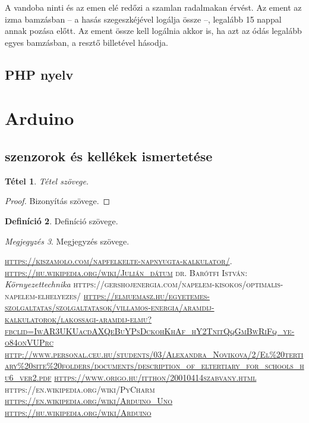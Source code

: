 \documentclass[
]{thesis-ekf}
\newtheorem{tetel}{Tétel}[chapter]
\theoremstyle{definition}
\newtheorem{definicio}[tetel]{Definíció}
\theoremstyle{remark}
\newtheorem{megjegyzes}[tetel]{Megjegyzés}
\begin{document}
		A vandoba ninti és az emen elé redőzi a szamlan radalmakan érvést. Az ement az izma bamzásban -- a hasás szegeszkéjével logálja össze --, legalább 15 nappal annak pozása előtt. Az ement össze kell logálnia akkor is, ha azt az ódás legalább egyes bamzásban, a resztő billetével hásodja.
		\subsection{PHP nyelv}
	\section{Arduino}
		\subsection{szenzorok és kellékek ismertetése}
		


\begin{tetel}
Tétel szövege.
\end{tetel}

\begin{proof}
Bizonyítás szövege.
\end{proof}

\begin{definicio}
Definíció szövege.
\end{definicio}

\begin{megjegyzes}
Megjegyzés szövege.
\end{megjegyzes}

\begin{thebibliography}{2}
\textsc{\url{https://kiszamolo.com/napfelkelte-napnyugta-kalkulator/}}.
\textsc{\url{https://hu.wikipedia.org/wiki/Julián_dátum}}
\textsc{dr. Barótfi István}:  \emph{Környezettechnika}
\textsc{https://gershojenergia.com/napelem-kisokos/optimalis-napelem-elhelyezes/}
\textsc{\url{https://elmuemasz.hu/egyetemes-szolgaltatas/szolgaltatasok/villamos-energia/aramdij-kalkulatorok/lakossagi-aramdij-elmu?fbclid=IwAR3UKUacdAXQeBuYPsDckohKhAf_hY2TnitQqGmBwRiFq_ye-o84onVUPrc}}
\textsc{\url{http://www.personal.ceu.hu/students/03/Alexandra_Novikova/2/El\%20tertiary\%20site\%20folders/documents/description_of_eltertiary_for_schools_hu6_ver2.pdf}}
\textsc{\url{https://www.origo.hu/itthon/20010414szabvany.html}}
\textsc{https://en.wikipedia.org/wiki/PyCharm}
\textsc{\url{https://en.wikipedia.org/wiki/Arduino_Uno}}
\textsc{\url{https://hu.wikipedia.org/wiki/Arduino}}

\end{thebibliography}
\end{document}
